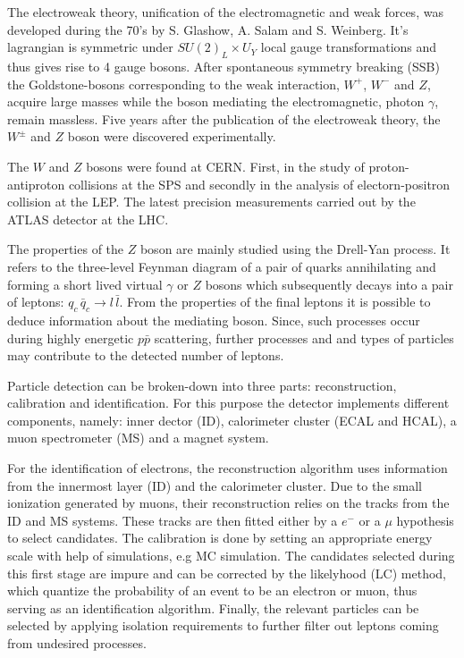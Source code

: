 \documentclass[11 pt]{article}
\begin{document}
The electroweak theory, unification of the electromagnetic and weak forces, was developed during the 70's by S. Glashow, A. Salam and S. Weinberg. It's lagrangian is symmetric under  $SU(2)_{L}\times U_{Y}$ local gauge transformations and thus gives rise to 4 gauge bosons. After spontaneous symmetry breaking (SSB) the Goldstone-bosons corresponding to the weak interaction, $W^{+}$, $W^{-}$ and $Z$, acquire large masses while the boson mediating the electromagnetic, photon $\gamma$, remain massless. Five years after the publication of the electroweak theory, the $W^\pm$ and $Z$ boson were discovered experimentally.

The $W$ and $Z$ bosons were found at CERN. First, in the study of proton-antiproton collisions at the SPS and secondly in the analysis of electorn-positron collision at the LEP. The latest precision measurements carried out by the ATLAS detector at the LHC. 

The properties of the $Z$ boson are mainly studied using the Drell-Yan process. It refers to the three-level Feynman diagram of a pair of quarks annihilating and forming a short lived virtual $\gamma$ or $Z$ bosons which subsequently decays into a pair of leptons: $q_c\, \bar{q}_c\to l\,\bar{l}$. From the properties of the final leptons it is possible to deduce information about the mediating boson. Since, such processes occur during highly energetic $p\bar{p}$ scattering, further processes and and types of particles may contribute to the detected number of leptons.
 
Particle detection can be broken-down into three parts: reconstruction, calibration and identification. For this purpose the detector implements different components, namely: inner dector (ID), calorimeter cluster (ECAL and HCAL), a muon spectrometer (MS) and a magnet system.  

For the identification of electrons, the reconstruction algorithm uses information from the innermost layer (ID) and the calorimeter cluster. Due to the small ionization generated by muons, their reconstruction relies on the tracks from the ID and MS systems. These tracks are then fitted either by a $e^-$ or a $\mu$ hypothesis to select candidates. The calibration is done by setting an appropriate energy scale with help of simulations, e.g MC simulation. The candidates selected during this first stage are impure and can be corrected by the likelyhood (LC) method, which quantize the probability of an event to be an electron or muon, thus serving as an identification algorithm. Finally, the relevant particles can be selected by applying isolation requirements to further filter out leptons coming from undesired processes. 
\end{document}
